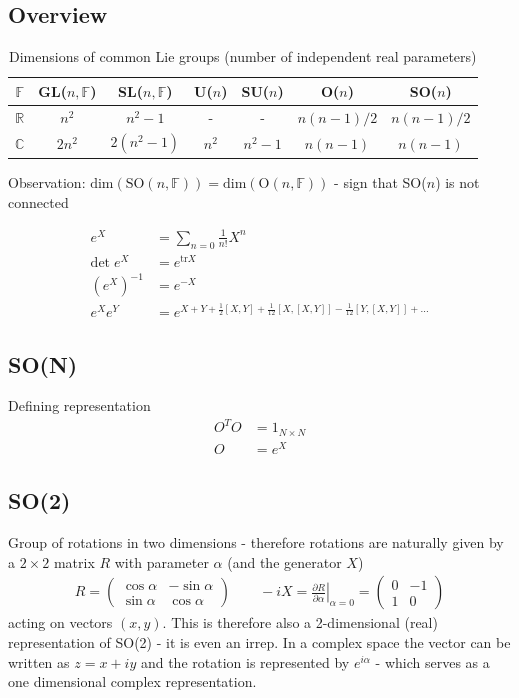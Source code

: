 \documentclass[10pt,a4paper]{book}
\theoremstyle{definition}
\begin{document}
\subsection{Overview}
\begin{table}[!h]
    \centering
    \begin{tabular}{c | c c c c c c}
        $\mathbb{F}$    & GL($n,\mathbb{F}$)    & SL($n,\mathbb{F}$) & U($n$) & SU($n$) & O($n$)     & SO($n$)     \\ \hline\hline
        $\mathbb{R}$    & $n^2$                 & $n^2-1$            & -      & -       & $n(n-1)/2$ & $n(n-1)/2$  \\
        $\mathbb{C}$    & $2n^2$                & $2(n^2-1)$         & $n^2$  & $n^2-1$ & $n(n-1)$   & $n(n-1)$    \\
    \end{tabular}
    \caption{Dimensions of common Lie groups (number of independent real parameters)}
    \label{tab:my_label}
\end{table}
Observation: $\text{dim}(\text{SO}(n,\mathbb{F}))=\text{dim}(\text{O}(n,\mathbb{F}))$  - sign that SO($n$) is not connected

\begin{align}
e^X&=\sum_{n=0}\frac{1}{n!}X^n\\
\text{det}\;e^X&=e^{\text{tr} X} \\
\left(e^X\right)^{-1}&=e^{-X}\\
e^Xe^Y&=e^{X+Y+\frac{1}{2}[X,Y]+\frac{1}{12}[X,[X,Y]]-\frac{1}{12}[Y,[X,Y]]+...}
\end{align}

\subsection{SO(N)}
Defining representation
\begin{align}
O^TO&=1_{N\times N}\\
O&=e^X
\end{align}

\subsection{SO(2)}
Group of rotations in two dimensions - therefore rotations are naturally given by a $2\times2$ matrix $R$ with parameter $\alpha$ (and the generator $X$)
\begin{align}
R=\left(\begin{matrix}
\cos\alpha  & -\sin\alpha\\
\sin\alpha & \cos\alpha
\end{matrix}\right)
\qquad
-iX=\left.\frac{\partial R}{\partial\alpha}\right|_{\alpha=0}=\left(\begin{matrix}
0 & -1\\
1 & 0
\end{matrix}\right)
\end{align}
acting on vectors $(x,y)$. This is therefore also a 2-dimensional (real) representation of SO(2) - it is even an irrep.
In a complex space the vector can be written as $z=x+iy$ and the rotation is represented by $e^{i\alpha}$ - which serves as a one dimensional complex representation.
\end{document}
